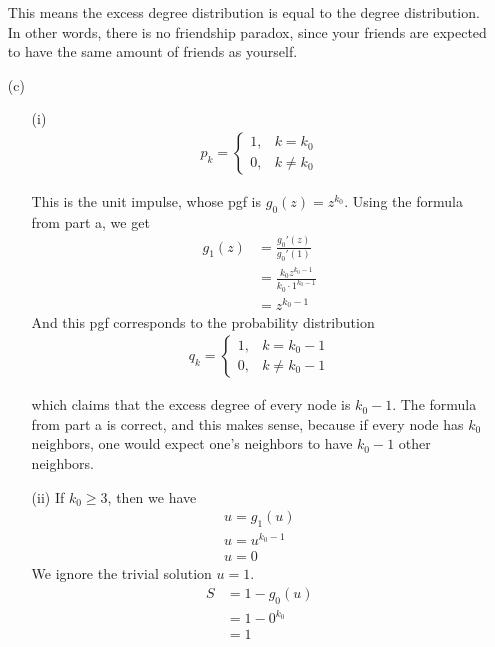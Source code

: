 \documentclass{article}
\begin{document}
\begin{enumerate}
  This means the excess degree distribution is equal to the degree distribution.
  In other words, there is no friendship paradox, since your friends are
  expected to have the same amount of friends as yourself.

  \item[(c)]
  \begin{enumerate}
    \item[(i)]
    \begin{align*}
      p_k =
      \begin{cases}
        1, & k = k_0 \\
        0, & k \ne k_0
      \end{cases}
    \end{align*}

    This is the unit impulse, whose pgf is \( g_0(z) = z^{k_0} \). Using the
    formula from part a, we get
    \begin{align*}
      g_1(z) &= \frac{g_0'(z)}{g_0'(1)} \\
      &= \frac{k_0 z^{k_0 - 1}}{k_0 \cdot 1^{k_0 - 1}} \\
      &= z^{k_0 - 1}
    \end{align*}
    And this pgf corresponds to the probability distribution
    \begin{align*}
      q_k =
      \begin{cases}
        1, & k = k_0 - 1 \\
        0, & k \ne k_0 - 1
      \end{cases}
    \end{align*}

    which claims that the excess degree of every node is \( k_0 - 1 \). The
    formula from part a is correct, and this makes sense, because if every node
    has \( k_0 \) neighbors, one would expect one's neighbors to have \( k_0 - 1
    \) other neighbors.

    \item[(ii)]
    If \( k_0 \ge 3 \), then we have
    \begin{gather*}
      u = g_1(u) \\
      u = u^{k_0 - 1} \\
      u = 0
    \end{gather*}
    We ignore the trivial solution \( u = 1 \).
    \begin{align*}
      S &= 1 - g_0(u) \\
      &= 1 - 0^{k_0} \\
      &= 1
    \end{align*}
  \end{enumerate}
\end{enumerate}
\end{document}
